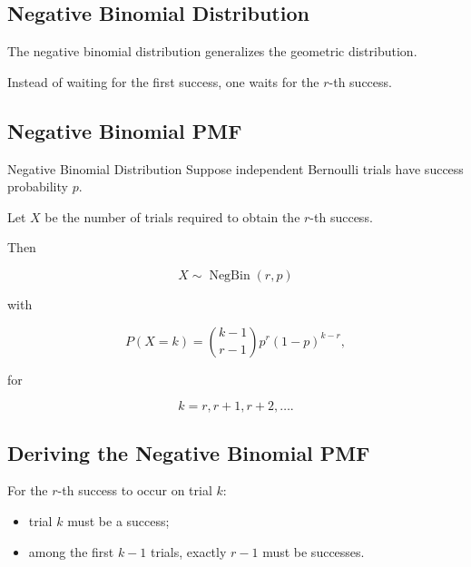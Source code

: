 \subsection{Negative Binomial Distribution}
\label{subsec:negative-binomial-distribution}

The negative binomial distribution generalizes the geometric
distribution.

Instead of waiting for the first success, one waits for the \(r\)-th
success.

\subsection{Negative Binomial PMF}
\label{subsec:negative-binomial-pmf}

\begin{definitionbox}{Negative Binomial Distribution}
Suppose independent Bernoulli trials have success probability \(p\).

Let \(X\) be the number of trials required to obtain the \(r\)-th
success.

Then

\[
\boxed{
X\sim\operatorname{NegBin}(r,p)
}
\]

with

\[
\boxed{
P(X=k)
=
\binom{k-1}{r-1}
p^r
(1-p)^{k-r},
}
\]

for

\[
k=r,r+1,r+2,\ldots.
\]
\end{definitionbox}

\subsection{Deriving the Negative Binomial PMF}
\label{subsec:derive-negative-binomial}

For the \(r\)-th success to occur on trial \(k\):

\begin{itemize}
    \item trial \(k\) must be a success;
    \item among the first \(k-1\) trials, exactly \(r-1\) must be
          successes.
\end{itemize}

